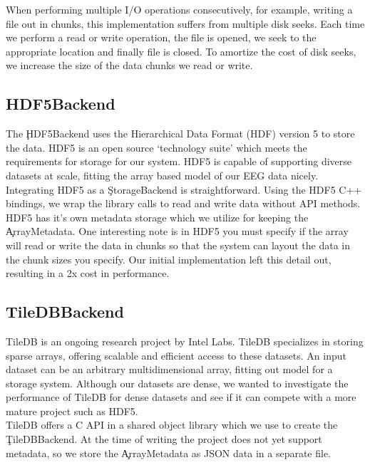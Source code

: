 When performing multiple I/O operations consecutively, for example, writing a
file out in chunks, this implementation suffers from multiple disk seeks. Each
time we perform a read or write operation, the file is opened, we seek to the
appropriate location and finally file is closed. To amortize the cost of disk
seeks, we increase the size of the data chunks we read or write.

\subsection{HDF5Backend}\label{storage-ch:implementation-hdf5}

The \c{HDF5Backend} uses the Hierarchical Data Format (HDF) version 5
\cite{hdf5} to store the data. HDF5 is an open source `technology suite' which
meets the requirements for storage for our system. HDF5 is capable of
supporting diverse datasets at scale, fitting the array based model of our
EEG data nicely. \\

Integrating HDF5 as a \c{StorageBackend} is straightforward. Using the HDF5 C++
bindings, we wrap the library calls to read and write data without API methods.
HDF5 has it's own metadata storage which we utilize for keeping the
\c{ArrayMetadata}. One interesting note is in HDF5 you must specify if the
array will read or write the data in chunks so that the system can layout the
data in the chunk sizes you specify. Our initial implementation left this
detail out, resulting in a 2x cost in performance.

\subsection{TileDBBackend}\label{storage-ch:implementation-tiledb}

TileDB \cite{tiledb} is an ongoing research project by Intel Labs. TileDB
specializes in storing sparse arrays, offering scalable and efficient access to
these datasets. An input dataset can be an arbitrary multidimensional array,
fitting out model for a storage system. Although our datasets are dense, we
wanted to investigate the performance of TileDB for dense datasets and see if
it can compete with a more mature project such as HDF5.\\

TileDB offers a C API in a shared object library which we use to create the
\c{TileDBBackend}. At the time of writing the project does not yet support
metadata, so we store the \c{ArrayMetadata} as JSON data in a separate file. \\

